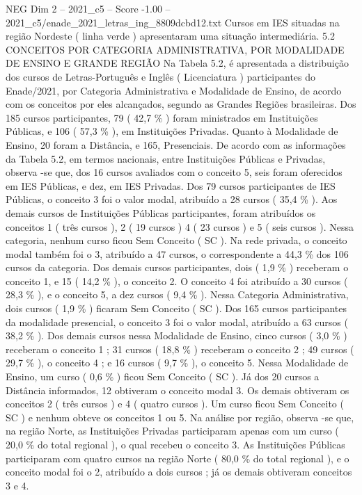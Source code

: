 \begin{textsample}{NEG Dim 2 – 2021\_c5 – Score -1.00 – 2021\_c5/enade\_2021\_letras\_ing\_8809dcbd12.txt}
Cursos em IES situadas na região Nordeste ( linha verde ) apresentaram uma situação intermediária. 5.2 CONCEITOS POR CATEGORIA ADMINISTRATIVA, POR MODALIDADE DE ENSINO E GRANDE REGIÃO Na Tabela 5.2, é apresentada a distribuição dos cursos de Letras-Português e Inglês ( Licenciatura ) participantes do Enade/2021, por Categoria Administrativa e Modalidade de Ensino, de acordo com os conceitos por eles alcançados, segundo as Grandes Regiões brasileiras.
Dos 185 cursos participantes, 79 ( 42,7 \% ) foram ministrados em Instituições Públicas, e 106 ( 57,3 \% ), em Instituições Privadas.
Quanto à Modalidade de Ensino, 20 foram a Distância, e 165, Presenciais.
De acordo com as informações da Tabela 5.2, em termos nacionais, entre Instituições Públicas e Privadas, observa -se que, dos 16 cursos avaliados com o conceito 5, seis foram oferecidos em IES Públicas, e dez, em IES Privadas.
Dos 79 cursos participantes de IES Públicas, o conceito 3 foi o valor modal, atribuído a 28 cursos ( 35,4 \% ).
Aos demais cursos de Instituições Públicas participantes, foram atribuídos os conceitos 1 ( três cursos ), 2 ( 19 cursos ) 4 ( 23 cursos ) e 5 ( seis cursos ).
Nessa categoria, nenhum curso ficou Sem Conceito ( SC ).
Na rede privada, o conceito modal também foi o 3, atribuído a 47 cursos, o correspondente a 44,3 \% dos 106 cursos da categoria.
Dos demais cursos participantes, dois ( 1,9 \% ) receberam o conceito 1, e 15 ( 14,2 \% ), o conceito 2.
O conceito 4 foi atribuído a 30 cursos ( 28,3 \% ), e o conceito 5, a dez cursos ( 9,4 \% ).
Nessa Categoria Administrativa, dois cursos ( 1,9 \% ) ficaram Sem Conceito ( SC ).
Dos 165 cursos participantes da modalidade presencial, o conceito 3 foi o valor modal, atribuído a 63 cursos ( 38,2 \% ).
Dos demais cursos nessa Modalidade de Ensino, cinco cursos ( 3,0 \% ) receberam o conceito 1 ; 31 cursos ( 18,8 \% ) receberam o conceito 2 ; 49 cursos ( 29,7 \% ), o conceito 4 ; e 16 cursos ( 9,7 \% ), o conceito 5.
Nessa Modalidade de Ensino, um curso ( 0,6 \% ) ficou Sem Conceito ( SC ).
Já dos 20 cursos a Distância informados, 12 obtiveram o conceito modal 3.
Os demais obtiveram os conceitos 2 ( três cursos ) e 4 ( quatro cursos ).
Um curso ficou Sem Conceito ( SC ) e nenhum obteve os conceitos 1 ou 5.
Na análise por região, observa -se que, na região Norte, as Instituições Privadas participaram apenas com um curso ( 20,0 \% do total regional ), o qual recebeu o conceito 3.
As Instituições Públicas participaram com quatro cursos na região Norte ( 80,0 \% do total regional ), e o conceito modal foi o 2, atribuído a dois cursos ; já os demais obtiveram conceitos 3 e 4.

\end{textsample}
